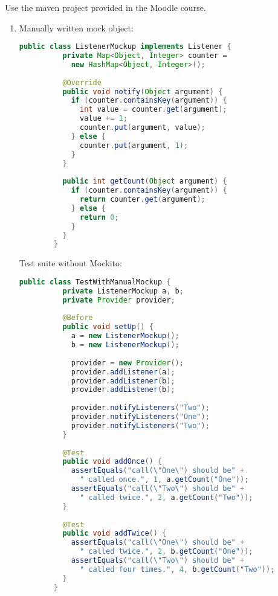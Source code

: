 \documentclass[language=en,sheet=1,prefix]{exercise}
\begin{document}
Use the maven project provided in the Moodle course.

\begin{solution}
  \begin{enumerate}
    \item Manually written mock object:

      \begin{lstlisting}[language=Java,gobble=8]
        public class ListenerMockup implements Listener {
          private Map<Object, Integer> counter =
            new HashMap<Object, Integer>();
          
          @Override
          public void notify(Object argument) {
            if (counter.containsKey(argument)) {
              int value = counter.get(argument);
              value += 1;
              counter.put(argument, value);
            } else {
              counter.put(argument, 1);
            }
          }
          
          public int getCount(Object argument) {
            if (counter.containsKey(argument)) {
              return counter.get(argument);
            } else {
              return 0;
            }
          }
        }
      \end{lstlisting}

      Test suite without Mockito:

      \begin{lstlisting}[language=Java,gobble=8]
        public class TestWithManualMockup {
          private ListenerMockup a, b;
          private Provider provider;
          
          @Before
          public void setUp() {
            a = new ListenerMockup();
            b = new ListenerMockup();
            
            provider = new Provider();
            provider.addListener(a);
            provider.addListener(b);
            provider.addListener(b);
            
            provider.notifyListeners("Two");
            provider.notifyListeners("One");
            provider.notifyListeners("Two");
          }
          
          @Test
          public void addOnce() {
            assertEquals("call(\"One\") should be" +
              " called once.", 1, a.getCount("One"));
            assertEquals("call(\"Two\") should be" +
              " called twice.", 2, a.getCount("Two"));
          }
          
          @Test
          public void addTwice() {
            assertEquals("call(\"One\") should be" +
              " called twice.", 2, b.getCount("One"));
            assertEquals("call(\"Two\") should be" +
              " called four times.", 4, b.getCount("Two"));
          }
        }
      \end{lstlisting}


\end{enumerate}
\end{solution}
\end{document}
